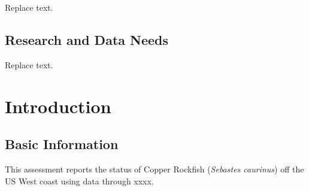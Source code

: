 \documentclass[11pt,
  english,
  a4paper,
]{article}
\begin{document}

Replace text.

\leavevmode\tagmcend\tagstructend\par


\hypertarget{research-and-data-needs}{%
\subsection*{Research and Data Needs}\label{research-and-data-needs}}

\leavevmode\tagmcend\tagstructend


Replace text.

\leavevmode\tagmcend\tagstructend\par

\pagebreak
\setlength{\parskip}{5mm plus1mm minus1mm}
\setcounter{page}{1}
\renewcommand{\thefigure}{\arabic{figure}}
\renewcommand{\thetable}{\arabic{table}}


\hypertarget{introduction}{%
\section{Introduction}\label{introduction}}

\leavevmode\tagmcend\tagstructend


\hypertarget{basic-information}{%
\subsection{Basic Information}\label{basic-information}}

\leavevmode\tagmcend\tagstructend


This assessment reports the status of Copper Rockfish (\emph{Sebastes caurinus}) off the US West coast using data through xxxx.

\leavevmode\tagmcend\tagstructend\par

\end{document}

